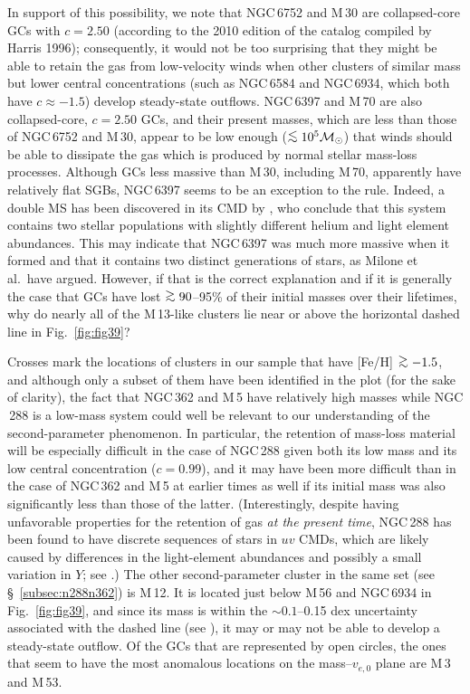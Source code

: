 \documentclass[12pt,preprint]{aastex}
\newcommand\msol{{\cal M_{\odot}}}
\newcommand\lta{\mathrel{\hbox{\raise 0.6 ex \hbox{$<$}\kern
                   -1.8 ex\lower .5 ex\hbox{$\sim$}}}}
\newcommand\gta{\mathrel{\hbox{\raise 0.6 ex \hbox{$>$}\kern
                   -1.7 ex\lower .5 ex\hbox{$\sim$}}}}
\begin{document}
In support of this possibility, we note that NGC$\,$6752 and M$\,$30 are
collapsed-core GCs with $c = 2.50$ (according to the 2010 edition of the catalog
compiled by Harris 1996); consequently, it would not be too surprising that they
might be able to retain the gas from low-velocity winds when other clusters of
similar mass but lower central concentrations (such as NGC$\,$6584 and
NGC$\,$6934, which both have $c \approx -1.5$) develop steady-state outflows.
NGC$\,$6397 and M$\,$70 are also collapsed-core, $c= 2.50$ GCs, and their
present masses, which are less than those of NGC$\,$6752 and M$\,$30, appear to
be low enough ($\lta 10^5 \msol$) that winds should be able to dissipate the gas
which is produced by normal stellar mass-loss processes.  Although GCs less
massive than M$\,$30, including M$\,$70, apparently have relatively flat SGBs,
NGC$\,$6397 seems to be an exception to the rule.  Indeed, a double MS has been 
discovered in its CMD by \citet{mmp12}, who conclude that this system contains
two stellar populations with slightly different helium and light element
abundances.  This may indicate that NGC$\,$6397 was much more massive when it
formed and that it contains two distinct generations of stars, as Milone et
al.~have argued.  However, if that is the correct explanation and if it is
generally the case that GCs have lost $\gta 90$--95\% of their initial masses
over their lifetimes, why do nearly all of the M$\,$13-like clusters lie near
or above the horizontal dashed line in Fig.~\ref{fig:fig39}? 

Crosses mark the locations of clusters in our sample that have [Fe/H] $\gta
-1.5$, and although only a subset of them have been identified in the plot (for
the sake of clarity), the fact that NGC$\,$362 and M$\,$5 have relatively high
masses while NGC$\,$288 is a low-mass system could well be relevant to our
understanding of the second-parameter phenomenon.  In particular, the retention
of mass-loss material will be especially difficult in the case of NGC$\,$288
given both its low mass and its low central concentration ($c = 0.99$), and it
may have been more difficult than in the case of NGC$\,$362 and M$\,$5 at
earlier times as well if its initial mass was also significantly less than those
of the latter.  (Interestingly, despite having unfavorable properties for the
retention of gas {\it at the present time}, NGC$\,$288 has been found to have
discrete sequences of stars in $uv$ CMDs, which are likely caused by differences
in the light-element abundances and possibly a small variation in $Y$; see
\citealt{pmm13}.)   The other second-parameter cluster in the same set (see
\S~\ref{subsec:n288n362}) is M$\,$12.  It is located just below M$\,$56
and NGC$\,$6934 in Fig.~\ref{fig:fig39}, and since its mass is within the $\sim
0.1$--0.15 dex uncertainty associated with the dashed line (see \citealt{vf77}),
it may or may not be able to develop a steady-state outflow.  Of the GCs that
are represented by open circles, the ones that seem to have the most anomalous
locations on the mass--$v_{e,0}$ plane are M$\,$3 and M$\,$53.
\end{document}

